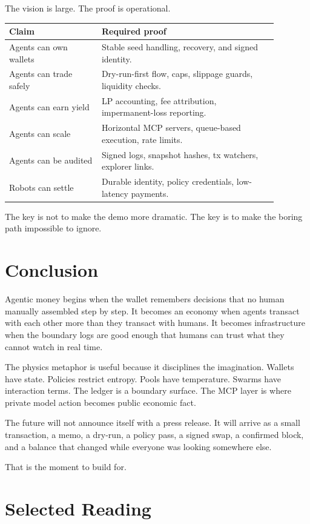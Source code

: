 \documentclass[11pt,a4paper]{article}
\begin{document}
The vision is large. The proof is operational.

\begin{longtable}{p{0.3\linewidth}p{0.58\linewidth}}
\toprule
\textbf{Claim} & \textbf{Required proof} \\
\midrule
Agents can own wallets & Stable seed handling, recovery, and signed identity. \\
Agents can trade safely & Dry-run-first flow, caps, slippage guards, liquidity checks. \\
Agents can earn yield & LP accounting, fee attribution, impermanent-loss reporting. \\
Agents can scale & Horizontal MCP servers, queue-based execution, rate limits. \\
Agents can be audited & Signed logs, snapshot hashes, tx watchers, explorer links. \\
Robots can settle & Durable identity, policy credentials, low-latency payments. \\
\bottomrule
\end{longtable}

The key is not to make the demo more dramatic. The key is to make the boring path impossible to ignore.

\section{Conclusion}

Agentic money begins when the wallet remembers decisions that no human manually assembled step by step. It becomes an economy when agents transact with each other more than they transact with humans. It becomes infrastructure when the boundary logs are good enough that humans can trust what they cannot watch in real time.

The physics metaphor is useful because it disciplines the imagination. Wallets have state. Policies restrict entropy. Pools have temperature. Swarms have interaction terms. The ledger is a boundary surface. The MCP layer is where private model action becomes public economic fact.

The future will not announce itself with a press release. It will arrive as a small transaction, a memo, a dry-run, a policy pass, a signed swap, a confirmed block, and a balance that changed while everyone was looking somewhere else.

That is the moment to build for.

\newpage
\section*{Selected Reading}
\end{document}
